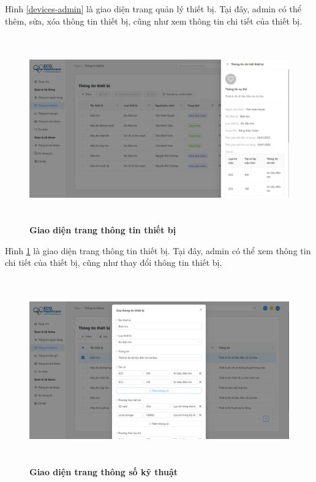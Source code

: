 Hình \ref{devices-admin} là giao diện trang quản lý thiết bị. Tại đây, admin có thể thêm, sửa, xóa thông tin thiết bị, cũng như xem thông tin chi tiết của thiết bị.

\begin{figure}[H]
	\centering
	\includegraphics[width=15cm,height=8cm]{Images/admin_ui/device-info.png}
	\caption[Giao diện trang thông tin thiết bị]{\bfseries \fontsize{12pt}{0pt}\selectfont Giao diện trang thông tin thiết bị}
	\label{device-info-admin}
\end{figure}

Hình \ref{device-info-admin} là giao diện trang thông tin thiết bị. Tại đây, admin có thể xem thông tin chi tiết của thiết bị, cũng như thay đổi thông tin thiết bị.

\begin{figure}[H]
	\centering
	\includegraphics[width=15cm,height=8cm]{Images/admin_ui/device-detail.png}
	\caption[Giao diện trang thông số kỹ thuật]{\bfseries \fontsize{12pt}{0pt}\selectfont Giao diện trang thông số kỹ thuật}
	\label{device-detail-admin}
\end{figure}

